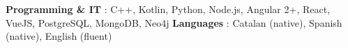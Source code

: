 


\begin{cventries}

\cventryC
    {\bullet \textbf{Programming \& IT} : C++, Kotlin, Python, Node.js, Angular 2+, React, VueJS, PostgreSQL, MongoDB, Neo4j \hspace{9 cm} 
    \bullet \textbf{Languages} : Catalan (native), Spanish (native), English (fluent)}
    {}
    {}
    {}
    {}
 
\end{cventries}
